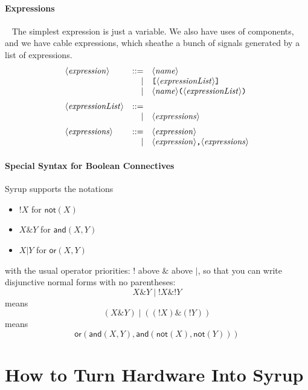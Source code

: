 \documentclass{article}
\newcommand{\C}{\mathsf}
\begin{document}
\paragraph{Expressions}~ The simplest expression is just a variable.
We also have uses of components, and we have cable expressions, which
sheathe a bunch of signals generated by a list of expressions.
\[\begin{array}{lrl}
    \NT{expression} & ::= & \NT{name} \\
                    &   | & \cab{\NT{expressionList}} \\
                    &   | & \NT{name}\pa{\NT{expressionList}}\medskip\\
    \NT{expressionList} & ::= & \\
              &   | & \NT{expressions}  \medskip\\
    \NT{expressions} & ::= & \NT{expression} \\
               &   | & \NT{expression}\texttt{,}\NT{expressions}
  \end{array} \]

\paragraph{Special Syntax for Boolean Connectives}

Syrup supports the notations
\begin{itemize}
\item $!X$ for $\C{not}(X)$
\item $X \& Y$ for $\C{and}(X,Y)$
\item $ X | Y$ for $\C{or}(X,Y)$
\end{itemize}
with the usual operator priorities: $!$ above $\&$ above $|$, so that
you can write disjunctive normal forms with no parentheses:
\[X \& Y \;|\; !X \& !Y
\]
means
\[(X \& Y) \;|\; ((!X) \& (!Y))
\]
means
\[\C{or}(\C{and}(X,Y),\C{and}(\C{not}(X),\C{not}(Y)))
\]

\section{How to Turn Hardware Into Syrup}

\newcommand{\fbx}[1]{\framebox{\ensuremath{#1}}}
\end{document}
